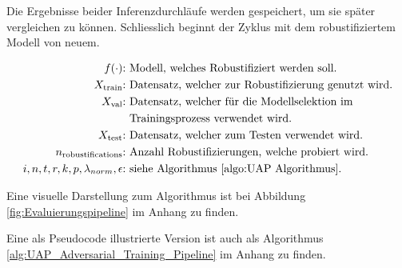 Die Ergebnisse beider Inferenzdurchläufe werden gespeichert, um sie später vergleichen zu können. Schliesslich beginnt der Zyklus mit dem robustifiziertem Modell von neuem.

\begin{align*}
f(\cdot)\text{:} &\text{ Modell, welches Robustifiziert werden soll.} \\
X_{\text{train}}\text{:} &\text{ Datensatz, welcher zur Robustifizierung genutzt wird.} \\
X_{\text{val}}\text{:} &\text{ Datensatz, welcher für die Modellselektion im} \\
 &\text{ Trainingsprozess verwendet wird.}\\
X_{\text{test}}\text{:} &\text{ Datensatz, welcher zum Testen verwendet wird.} \\
n_{\text{robustifications}}\text{:} &\text{ Anzahl Robustifizierungen, welche probiert wird.} \\
i,n,t,r,k,p,\lambda_{norm},\epsilon\text{:} &\text{ siehe Algorithmus \ref{algo:UAP Algorithmus}.}
\end{align*}

Eine visuelle Darstellung zum Algorithmus ist bei Abbildung \ref{fig:Evaluierungspipeline} im Anhang zu finden.

Eine als Pseudocode illustrierte Version ist auch als Algorithmus \ref{alg:UAP_Adversarial_Training_Pipeline} im Anhang zu finden.